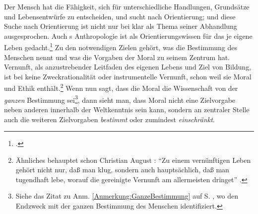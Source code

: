 Der Mensch hat die Fähigkeit, sich für unterschiedliche Handlungen, Grundsätze
und Lebensentwürfe zu entscheiden, und sucht nach Orientierung; und diese Suche
nach Orientierung ist nicht nur bei
 klar als
Thema seiner Abhandlung ausgesprochen. Auch s Anthropologie
ist als Orientierungswissen für das je eigene Leben
gedacht.\footcite[Vgl.][105--108]{Cohen:KantandtheHumanSciences2009} Zu den
notwendigen Zielen gehört, was  die Bestimmung des Menschen
nennt und was die Vorgaben der Moral zu seinem Zentrum hat. Vernunft, als
anzustrebender Leitfaden des eigenen Lebens und Ziel von Bildung, ist bei
 keine Zweckrationalität oder instrumentelle Vernunft,
schon weil sie Moral und Ethik enthält.\footnote{Ähnliches behauptet schon
Christian August :
\enquote{Zu einem vernünftigen Leben gehört nicht nur, daß man klug, sondern
auch hauptsächlich, daß man tugendhaft lebe, worauf die gereinigte Vernunft am
allermeisten dringet} \parencite[][Vorrede,
unpaginiert]{Crusius:Anweisungvernuenftigzuleben1744}.} Wenn
 nun sagt, dass die Moral die Wissenschaft von der
\emph{ganzen} Bestimmung sei\footnote{Siehe das Zitat zu Anm.
\ref{Anmerkung:GanzeBestimmung} auf S. \pageref{Anmerkung:GanzeBestimmung},
wo  den Endzweck mit der ganzen Bestimmung des Menschen
identifiziert.}, dann sieht man, dass Moral nicht eine Zielvorgabe neben anderen
innerhalb der Weltkenntnis sein kann, sondern an zentraler Stelle auch die weiteren Zielvorgaben \emph{bestimmt} oder zumindest \emph{einschränkt}.

